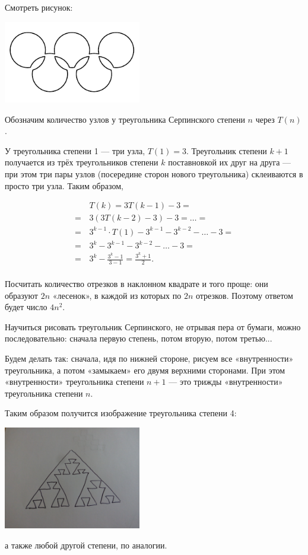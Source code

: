 
\begin{itemize}
\itA Смотреть рисунок:

\begin{center}
	\includegraphics[natwidth=3309,natheight=1272,width=6cm]{figures/2018-serpinsky-a}
\end{center}

\itB Обозначим количество узлов у треугольника Серпинского степени $n$ через $T(n)$.

У треугольника степени 1 — три узла, $T(1)=3$. Треугольник степени $k+1$ получается из  трёх треугольников степени $k$ поставновкой их друг на друга — при этом три пары узлов (посередине сторон нового треугольника) склеиваются в просто три узла. Таким образом,

\begin{align*}
	& T(k) = 3T(k-1) - 3 =\\
	=\, & 3(3T(k-2)-3)-3 = \ldots = \\
	=\, & 3^{k-1}\cdot T(1) - 3^{k-1} - 3^{k-2} - \ldots - 3 = \\
	=\, & 3^k - 3^{k-1} - 3^{k-2} - \ldots - 3 = \\
	=\, & 3^k - \frac{3^k-1}{3-1} = \frac{3^k+1}{2}. \\
\end{align*}

\vspace{-0.4cm}
Посчитать количество отрезков в наклонном квадрате и того проще: они образуют $2n$ «лесенок», в каждой из которых по $2n$ отрезков. Поэтому ответом будет число $4n^2$.

\itC Научиться рисовать треугольник Серпинского, не отрывая пера от бумаги, можно последовательно: сначала первую степень, потом вторую, потом третью...

Будем делать так: сначала, идя по нижней стороне, рисуем все «внутренности» треугольника, а потом «замыкаем» его двумя верхними сторонами. При этом «внутренности» треугольника степени $n+1$ — это трижды «внутренности» треугольника степени $n$.

Таким образом получится изображение треугольника степени 4:

\begin{center}
	\includegraphics[natwidth=4160,natheight=3120,width=6cm]{figures/2018-serpinsky-c}
\end{center}

а также любой другой степени, по аналогии.
\end{itemize}